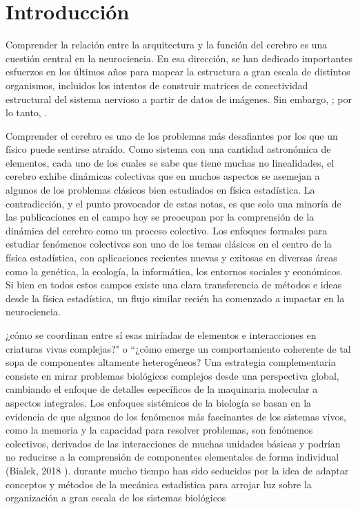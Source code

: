 \chapter{Introducción}

Comprender la relación entre la arquitectura y la función del cerebro es una cuestión central en la neurociencia. En esa dirección, se han dedicado importantes esfuerzos en los últimos años para mapear la estructura a gran escala de distintos organismos, incluidos los intentos de construir matrices de conectividad estructural del sistema nervioso a partir de datos de imágenes.  Sin embargo,   ; por lo tanto,  \cite{sporns_discovering_2012}.


Comprender el cerebro es uno de los problemas más desafiantes por los que un físico puede sentirse atraído. Como sistema con una cantidad astronómica de elementos, cada uno de los cuales se sabe que tiene muchas no linealidades, el cerebro exhibe dinámicas colectivas que en muchos aspectos se asemejan a algunos de los problemas clásicos bien estudiados en física estadística. La contradicción, y el punto provocador de estas notas, es que solo una minoría de las publicaciones en el campo hoy se preocupan por la comprensión de la dinámica del cerebro como un proceso colectivo. Los enfoques formales para estudiar fenómenos colectivos son uno de los temas clásicos en el centro de la física estadística, con aplicaciones recientes nuevas y exitosas en diversas áreas como la genética, la ecología, la informática, los entornos sociales y económicos. Si bien en todos estos campos existe una clara transferencia de métodos e ideas desde la física estadística, un flujo similar recién ha comenzado a impactar en la neurociencia.

¿cómo se coordinan entre sí esas miríadas de elementos e interacciones en criaturas vivas complejas?" o “¿cómo emerge un comportamiento coherente de tal sopa de componentes altamente heterogéneos? Una estrategia complementaria consiste en mirar problemas biológicos complejos desde una perspectiva global, cambiando el enfoque de detalles específicos de la maquinaria molecular a aspectos integrales.  Los enfoques sistémicos de la biología se basan en la evidencia de que algunos de los fenómenos más fascinantes de los sistemas vivos, como la memoria y la capacidad para resolver problemas, son fenómenos colectivos, derivados de las interacciones de muchas unidades básicas y podrían no reducirse a la comprensión de componentes elementales de forma individual (Bialek, 2018 ).  durante mucho tiempo han sido seducidos por la idea de adaptar conceptos y métodos de la mecánica estadística para arrojar luz sobre la organización a gran escala de los sistemas biológicos

